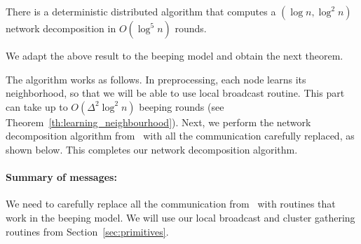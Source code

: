 
\begin{theorem}\cite{ghaffari2021improved}
    There is a deterministic distributed algorithm that computes a $(\log n, \log^2 n)$ network decomposition in $O(\log^5 n)$ \congest rounds.
\end{theorem}

We adapt the above result to the beeping model and obtain the next theorem.

\networkdecompthm*
{}

The algorithm works as follows. In preprocessing, each node learns its neighborhood, so that we will be able to use local broadcast routine.
This part can take up to $O(\Delta^2 \log^2 n)$ beeping rounds (see Theorem~\ref{th:learning_neighbourhood}). Next, we perform the network decomposition algorithm from~\cite{ghaffari2021improved} with all the communication carefully replaced, as shown 
below. This completes our network decomposition algorithm.




\label{sec:rundown}


\paragraph{Summary of messages:}
We need to carefully replace all the communication from~\cite{ghaffari2021improved} with routines that work in the beeping model. We will use our local broadcast and cluster gathering routines from Section~\ref{sec:primitives}.

